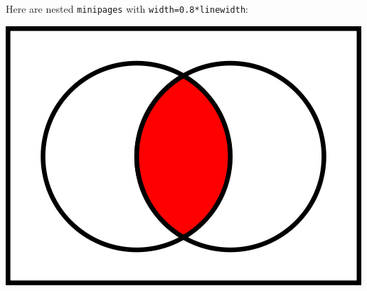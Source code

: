 Here are nested {\tt minipages} with {\tt width=0.8*linewidth}:
\begin{framed}
\begin{minipage}{\textwidth}
\begin{minipage}{0.5\textwidth}
\lipsum[2-2]
\end{minipage}
\begin{minipage}{0.5\linewidth}
\qquad\includegraphics[width=0.8\linewidth]{AcapB}
\end{minipage}
\end{minipage}
\end{framed}


